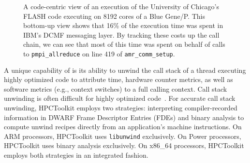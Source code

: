 \documentclass[11pt,twoside,letterpaper]{report}
\begin{document}
\begin{figure}[t]
\caption{A code-centric view of an execution of the University of Chicago's FLASH code executing on 8192 cores of a Blue Gene/P. This bottom-up view shows that 16\% of the execution time was spent in IBM's DCMF messaging layer. By tracking these costs up the call chain, we can see that most of this time   was spent on behalf of calls to {\tt pmpi\_allreduce} on line 419 of {\tt amr\_comm\_setup}.}
\label{fig:code-centric}
\end{figure}

A unique capability of \HPCToolkit{} is its ability to unwind the call stack of a thread executing highly optimized code to attribute time, hardware counter metrics, as well as software metrics (e.g., context switches) to a full calling context.
Call stack unwinding is often difficult for highly optimized code~\cite{Tallent-MC-Fagan:2009:PLDI-hpctoolkit-binary-analysis}. For accurate call stack unwinding, HPCToolkit employs two strategies:
interpreting compiler-recorded information in DWARF Frame Descriptor Entries (FDEs) and binary analysis
to compute unwind recipes directly from an application's  machine instructions.
On ARM processors, HPCToolkit uses {\tt libunwind} exclusively. On Power processors, HPCToolkit uses
binary analysis exclusively.
On x86\_64 processors, HPCToolkit employs both strategies in an integrated fashion.
\end{document}
